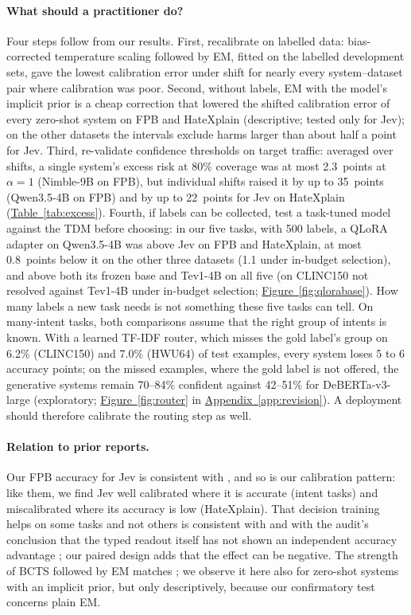 \paragraph{What should a practitioner do?}
Four steps follow from our results. First, recalibrate on labelled data: bias-corrected temperature scaling followed by
EM, fitted on the labelled development sets, gave the lowest calibration error under shift for nearly every
system--dataset pair where calibration was poor. Second, without labels, EM with the model's implicit prior is a cheap
correction that lowered the shifted calibration error of every zero-shot system on FPB and HateXplain (descriptive;
tested only for Jev);
on the other datasets the intervals exclude harms larger than about half a point for Jev. Third, re-validate confidence
thresholds on target traffic: averaged over shifts, a single system's excess risk at 80\% coverage was at most 2.3~points at $\alpha=1$ (Nimble-9B on FPB), but individual shifts raised it by up to 35~points (Qwen3.5-4B on FPB) and by
up to 22~points for Jev on HateXplain (\hyperref[tab:excess]{Table~\ref*{tab:excess}}). Fourth, if labels can be
collected, test a task-tuned model against the TDM before choosing: in our five tasks, with 500 labels, a QLoRA adapter on
Qwen3.5-4B was above Jev on FPB and HateXplain, at most 0.8~points below it on the other three datasets (1.1 under
in-budget selection), and above both its frozen base and Tev1-4B on all five (on CLINC150 not resolved against Tev1-4B
under in-budget selection; \hyperref[fig:qlorabase]{Figure~\ref*{fig:qlorabase}}). How many labels a new task
needs is not something these five tasks can tell. On many-intent tasks, both comparisons assume that the right group
of intents is known. With a learned TF-IDF router, which misses the gold label's group on 6.2\% (CLINC150) and 7.0\%
(HWU64) of test examples, every system loses 5 to 6 accuracy points; on the missed examples, where the gold label is
not offered, the generative systems remain 70--84\% confident against 42--51\% for DeBERTa-v3-large (exploratory;
\hyperref[fig:router]{Figure~\ref*{fig:router}} in \hyperref[app:revision]{Appendix~\ref*{app:revision}}). A deployment
should therefore calibrate the routing step as well.

\paragraph{Relation to prior reports.}
Our FPB accuracy for Jev is consistent with \citet{deusser2026jev}, and so is our calibration pattern: like them, we
find Jev well calibrated where it is accurate (intent tasks) and miscalibrated where its accuracy is low (HateXplain). That decision training helps on some tasks and not others is consistent
with \citet{li2026llmasjev} and with the audit's conclusion that the typed readout itself has not shown an independent
accuracy advantage \citep{tang2026audit}; our paired design adds that the effect can be negative. The strength of BCTS
followed by EM matches \citet{alexandari2020maximum}; we observe it here also for zero-shot systems with an implicit
prior, but only descriptively, because our confirmatory test concerns plain EM.
